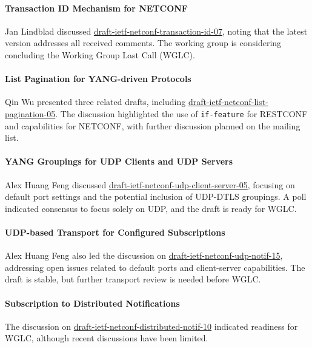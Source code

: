 \documentclass{article}
\begin{document}
\paragraph{Transaction ID Mechanism for NETCONF}
Jan Lindblad discussed \href{https://datatracker.ietf.org/doc/html/draft-ietf-netconf-transaction-id-07}{draft-ietf-netconf-transaction-id-07}, noting that the latest version addresses all received comments. The working group is considering concluding the Working Group Last Call (WGLC).

\paragraph{List Pagination for YANG-driven Protocols}
Qin Wu presented three related drafts, including \href{https://datatracker.ietf.org/doc/html/draft-ietf-netconf-list-pagination-05}{draft-ietf-netconf-list-pagination-05}. The discussion highlighted the use of \texttt{if-feature} for RESTCONF and capabilities for NETCONF, with further discussion planned on the mailing list.

\paragraph{YANG Groupings for UDP Clients and UDP Servers}
Alex Huang Feng discussed \href{https://datatracker.ietf.org/doc/html/draft-ietf-netconf-udp-client-server-05}{draft-ietf-netconf-udp-client-server-05}, focusing on default port settings and the potential inclusion of UDP-DTLS groupings. A poll indicated consensus to focus solely on UDP, and the draft is ready for WGLC.

\paragraph{UDP-based Transport for Configured Subscriptions}
Alex Huang Feng also led the discussion on \href{https://datatracker.ietf.org/doc/html/draft-ietf-netconf-udp-notif-15}{draft-ietf-netconf-udp-notif-15}, addressing open issues related to default ports and client-server capabilities. The draft is stable, but further transport review is needed before WGLC.

\paragraph{Subscription to Distributed Notifications}
The discussion on \href{https://datatracker.ietf.org/doc/html/draft-ietf-netconf-distributed-notif-10}{draft-ietf-netconf-distributed-notif-10} indicated readiness for WGLC, although recent discussions have been limited.
\end{document}
